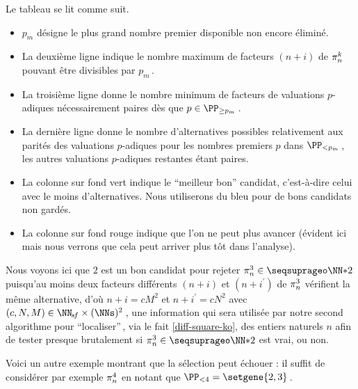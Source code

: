 Le tableau se lit comme suit.
%
\begin{itemize}
	\item $p_m$ désigne le plus grand nombre premier disponible non encore éliminé.

	\item La deuxième ligne indique le nombre maximum de facteurs $(n+i)$ de $\consprod$ pouvant être divisibles par $p_m$\,.

	\item La troisième ligne donne le nombre minimum de facteurs de valuations $p$-adiques nécessairement paires dès que $p \in \PP_{\geq p_m}$\,.

	\item La dernière ligne donne le nombre d'alternatives possibles relativement aux parités des valuations $p$-adiques pour les nombres premiers $p$ dans $\PP_{< p_m}$\,, les autres valuations $p$-adiques restantes étant paires.

	\item La colonne sur fond vert indique le \enquote{meilleur bon} candidat, c'est-à-dire celui avec le moins d'alternatives.
	Nous utiliserons du bleu pour de bons candidats non gardés.

	\item La colonne sur fond rouge indique que l'on ne peut plus avancer (évident ici mais nous verrons que cela peut arriver plus tôt dans l'analyse).
\end{itemize}


Nous voyons ici que $2$ est un bon candidat pour rejeter $\consprod<3> \in \NNssquare$ puisqu'au moins deux facteurs différents $(n+i)$ et $(n+i^\prime)$ de $\consprod<3>$ vérifient la même alternative, d'où $n+i = c M^2$ et $n+i^\prime = c N^2$ avec $(c, N, M) \in \NNsf \times ( \NNs )^2$\,, une information qui sera utilisée par notre second algorithme pour \enquote{localiser}\,, via le fait \ref{diff-square-ko}, des entiers naturels $n$ afin de tester presque brutalement si $\consprod<3> \in \NNssquare$ est vrai, ou non.




\medskip

Voici un autre exemple montrant que la sélection peut échouer : il suffit de considérer par exemple $\consprod<4>$ en notant que $\PP_{< 4} = \setgene{2, 3}$\,.

\begin{center}
\end{center}



